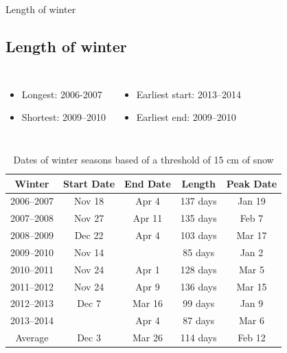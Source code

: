 \documentclass{beamer}
\begin{document}
\begin{frame}{Length of winter}

\subsection{Length of winter}

\begin{columns}

\begin{itemize}
\item Longest: 2006-2007
\item Shortest: 2009--2010
\end{itemize}


\begin{itemize}
\item Earliest start: 2013--2014
\item Earliest end: 2009--2010
\end{itemize}

\end{columns}

\begin{table}[ht]
\begin{tabular}{c c c c c}
\hline
Winter & Start Date & End Date & Length & Peak Date \\ \hline
2006--2007 & Nov 18 & Apr 4 & 137 days & Jan 19  \\
2007--2008 & Nov 27 & Apr 11 & 135 days & Feb 7 \\
2008--2009 & Dec 22 & Apr 4 & 103 days & Mar 17 \\
2009--2010 & Nov 14 & \color{black}{Feb 7} & 85 days & Jan 2 \\
2010--2011 & Nov 24 & Apr 1 & 128 days & Mar 5 \\
2011--2012 & Nov 24 & Apr 9 & 136 days & Mar 15 \\
2012--2013 & Dec 7 & Mar 16 & 99 days & Jan 9 \\
2013--2014 & \color{black}{Jan 7} & Apr 4 & 87 days & Mar 6 \\ \hline
Average & Dec 3 & Mar 26 & 114 days & Feb 12 \\ \hline
\end{tabular}
\caption{Dates of winter seasons based of a threshold of 15 cm of snow}
\end{table}

\end{frame}
\end{document}
